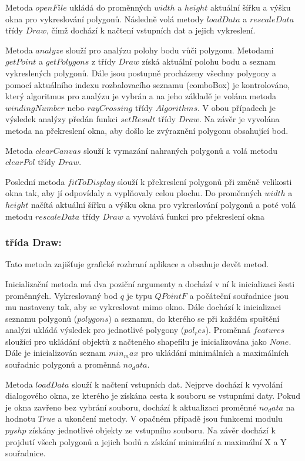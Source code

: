 \documentclass[15pt]{article}
\begin{document}
\begin{spacing}{1.5}
\noindent Metoda $openFile$ ukládá do proměnných $width$ a $height$ aktuální šířku a výšku okna pro vykreslování polygonů. Následně volá metody $loadData$ a $rescaleData$ třídy $Draw$, čímž dochází k načtení vstupních dat a jejich vykreslení.

\noindent Metoda $analyze$ slouží pro analýzu polohy bodu vůči polygonu. Metodami $getPoint$ a $getPolygons$ z třídy $Draw$ získá aktuální polohu bodu a seznam vykreslených polygonů. Dále jsou postupně procházeny všechny polygony a pomocí aktuálního indexu rozbalovacího seznamu (comboBox) je kontrolováno, který algoritmus pro analýzu je vybrán a na jeho základě je volána metoda $windingNumber$ nebo $rayCrossing$ třídy $Algorithms$. V obou případech je výsledek analýzy předán funkci $setResult$ třídy $Draw$. Na závěr je vyvolána metoda na překreslení okna, aby došlo ke zvýraznění polygonu obsahující bod.

\noindent Metoda $clearCanvas$ slouží k vymazání nahraných polygonů a volá metodu $clearPol$ třídy $Draw$. 

\noindent Poslední metoda $fitToDisplay$ slouží k překreslení polygonů při změně velikosti okna tak, aby jí odpovídaly a vyplňovaly celou plochu. Do proměnných $width$ a $height$ načítá aktuální šířku a výšku okna pro vykreslování polygonů a poté volá metodu $rescaleData$ třídy $Draw$ a vyvolává funkci pro překreslení okna

\subsubsection*{třída Draw:}
Tato metoda zajišťuje grafické rozhraní aplikace a obsahuje devět metod.

Inicializační metoda má dva poziční argumenty a dochází v ní k inicializaci šesti proměnných. Vykreslovaný bod  $q$ je typu $QPointF$ a počáteční souřadnice jsou mu nastaveny tak, aby se vykreslovat mimo okno. Dále dochází k inicializaci seznamu polygonů ($polygons$) a seznamu, do kterého se při každém spuštění analýzi ukládá výsledek pro jednotlivé polygony ($pol_res$). Proměnná $features$ sloužící pro ukládání objektů z načteného shapefilu je inicializována jako $None$. Dále je inicializován seznam $min_max$ pro ukládání minimálních a maximálních souřadnic polygonů a proměnná $no_data$.

\noindent Metoda $loadData$ slouží k načtení vstupních dat. Nejprve dochází k vyvolání dialogového okna, ze kterého je získána cesta k souboru se vstupními daty. Pokud je okna zavřeno bez vybrání souboru, dochází k aktualizaci proměnné $no_data$ na hodnotu $True$ a ukončení metody. V opačném případě jsou funkcemi modulu $pyshp$ získány jednotlivé objekty ze vstupního souboru. Na závěr dochází k projdutí všech polygonů a jejich bodů a získání minimální a maximální X a Y souřadnice.


\end{spacing}
\end{document}
